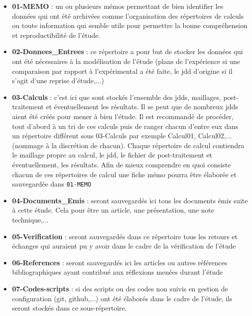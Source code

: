 \begin{itemize}[label=$\Rightarrow$, font=\LARGE]
   \item \textbf{01-MEMO} : un ou plusieurs mémos permettant de bien identifier les données qui ont été archivées comme l'organisation des répertoires de calculs ou toute information qui semble utile pour permettre la bonne compréhension et reproductibilité de l'étude.
   \item \textbf{02-Donnees\_Entrees} : ce répertoire a pour but de stocker les données qui ont été nécessaires à la modélisation de l'étude (plans de l'expérience si une comparaison par rapport à l'expérimental a été faite, le jdd d'origine si il s'agit d'une reprise d'étude,...) 
   \item \textbf{03-Calculs} : c'est ici que sont stockés l'ensemble des jdds, maillages, post-traitement et éventuellement les résultats. Il se peut que de nombreux jdds aient été créés pour mener à bien l'étude. Il est recommandé de procéder, tout d'abord à un tri de ces calculs puis de ranger chacun d'entre eux dans un répertoire différent sous 03-Calculs par exemple Calcul01, Calcul02,... (nommage à la discrétion de chacun). Chaque répertoire de calcul contiendra le maillage propre au calcul, le jdd, le fichier de post-traitement et éventuellement, les résultats. Afin de mieux comprendre en quoi consiste chacun de ces répertoires de calcul une fiche mémo pourra être élaborée et sauvegardée dans \texttt{01-MEMO}
   \item \textbf{04-Documents\_Emis} : seront sauvegardés ici tous les documents émis suite à cette étude. Cela pour être un article, une présentation, une note technique,... 
   \item \textbf{05-Verification} : seront sauvegardés dans ce répertoire tous les retours et échanges qui auraient pu y avoir dans le cadre de la vérification de l'étude
   \item \textbf{06-References} : seront sauvegardés ici les articles ou autres références bibliographiques ayant contribué aux réflexions menées durant l'étude
   \item \textbf{07-Codes-scripts} : si des scripts ou des codes non suivis en gestion de configuration (git, github,...) ont été élaborés dans le cadre de l'étude, ils seront stockés dans ce sous-répertoire.
\end{itemize}
